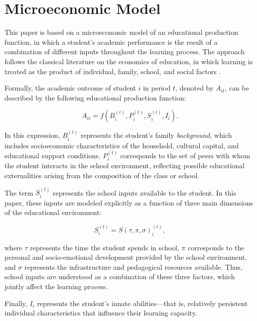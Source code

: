\section{Microeconomic Model} \label{sec:micromodel}

This paper is based on a microeconomic model of an educational production function, in which a student's academic performance is the result of a combination of different inputs throughout the learning process. The approach follows the classical literature on the economics of education, in which learning is treated as the product of individual, family, school, and social factors \parencite{funcaodeproducaoeducacional}.

Formally, the academic outcome of student $i$ in period $t$, denoted by $A_{it}$, can be described by the following educational production function:

\begin{equation}
A_{it} = f \left( B_{i}^{(t)}, P_{i}^{(t)}, S_{i}^{(t)}, I_i \right).
\end{equation}

In this expression, $B_{i}^{(t)}$ represents the student's family \textit{background}, which includes socioeconomic characteristics of the household, cultural capital, and educational support conditions. $P_{i}^{(t)}$ corresponds to the set of peers with whom the student interacts in the school environment, reflecting possible educational externalities arising from the composition of the class or school.

The term $S_{i}^{(t)}$ represents the school inputs available to the student. In this paper, these inputs are modeled explicitly as a function of three main dimensions of the educational environment:

\begin{equation} 
S_{i}^{(t)} = S(\tau,\pi,\sigma)_{i}^{(t)}, 
\end{equation}

where $\tau$ represents the time the student spends in school, $\pi$ corresponds to the personal and socio-emotional development provided by the school environment, and $\sigma$ represents the infrastructure and pedagogical resources available. Thus, school inputs are understood as a combination of these three factors, which jointly affect the learning process.

Finally, $I_i$ represents the student's innate abilities—that is, relatively persistent individual characteristics that influence their learning capacity.

